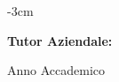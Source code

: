 \begin{titlepage}
\begin{addmargin}[-1cm]{-3cm}
\begin{minipage}[t]{0.47\textwidth}
            \vspace{1mm}
            \Large{\textbf{Tutor Aziendale:}\\ \mySupervisor}
        \end{minipage}
        \vspace{20mm}

        \begin{center}
            \Large{Anno Accademico \myAcademicYear}
        \end{center}
    \end{addmargin}

\end{titlepage}
